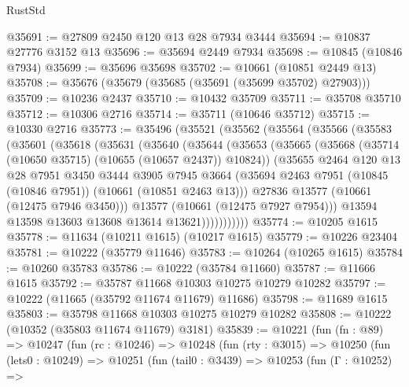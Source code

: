 \begin{lexlean}{RustStd}
\begin{coremodule}
@35691 := @27809 @2450 @120 @13 @28 @7934 @3444
@35694 := @10837 @27776 @3152 @13
@35696 := @35694 @2449 @7934
@35698 := @10845 (@10846 @7934)
@35699 := @35696 @35698
@35702 := @10661 (@10851 @2449 @13)
@35708 := @35676 (@35679 (@35685 (@35691 (@35699 @35702) @27903)))
@35709 := @10236 @2437
@35710 := @10432 @35709
@35711 := @35708 @35710
@35712 := @10306 @2716
@35714 := @35711 (@10646 @35712)
@35715 := @10330 @2716
@35773 := @35496
    (@35521
      (@35562
        (@35564
          (@35566
            (@35583
              (@35601
                (@35618
                  (@35631
                    (@35640
                      (@35644
                        (@35653
                          (@35665
                            (@35668 (@35714 (@10650 @35715) (@10655 (@10657 @2437)) @10824))
                            (@35655
                              @2464
                              @120
                              @13
                              @28
                              @7951
                              @3450
                              @3444
                              @3905
                              @7945
                              @3664
                              (@35694
                                @2463
                                @7951
                                (@10845 (@10846 @7951))
                                (@10661 (@10851 @2463 @13)))
                              @27836
                              @13577
                              (@10661 (@12475 @7946 @3450)))
                            @13577
                            (@10661 (@12475 @7927 @7954)))
                          @13594
                          @13598
                          @13603
                          @13608
                          @13614
                          @13621)))))))))))
@35774 := @10205 @1615
@35778 := @11634 (@10211 @1615) (@10217 @1615)
@35779 := @10226 @23404
@35781 := @10222 (@35779 @11646)
@35783 := @10264 (@10265 @1615)
@35784 := @10260 @35783
@35786 := @10222 (@35784 @11660)
@35787 := @11666 @1615
@35792 := @35787 @11668 @10303 @10275 @10279 @10282
@35797 := @10222 (@11665 (@35792 @11674 @11679) @11686)
@35798 := @11689 @1615
@35803 := @35798 @11668 @10303 @10275 @10279 @10282
@35808 := @10222 (@10352 (@35803 @11674 @11679) @3181)
@35839 := @10221
    (fun (fn : @89) =>
    @10247
      (fun (rc : @10246) =>
      @10248
        (fun (rty : @3015) =>
        @10250
          (fun (lets0 : @10249) =>
          @10251
            (fun (tail0 : @3439) =>
            @10253
              (fun (Γ : @10252) =>

\end{coremodule}
\end{lexlean}

